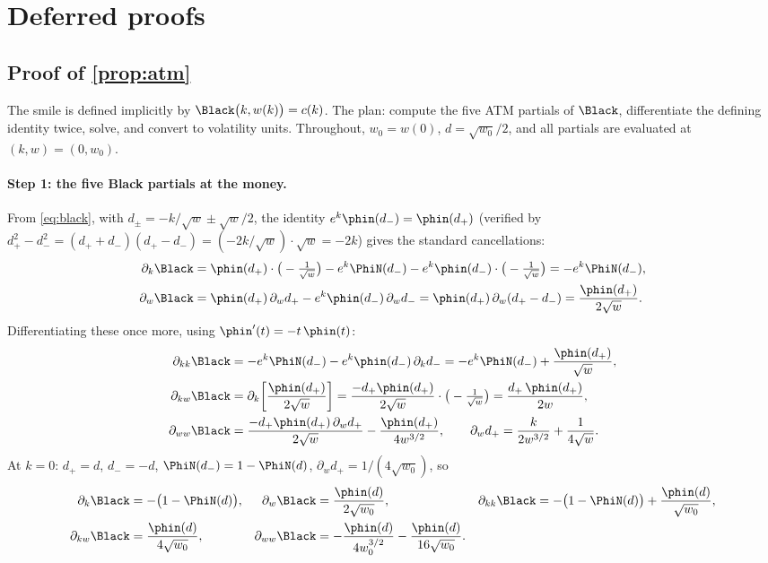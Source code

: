 \section{Deferred proofs}
\label{app:proofs}

\subsection{Proof of \texorpdfstring{\cref{prop:atm}}{the ATM proposition}}
\label{app:atmproof}

The smile is defined implicitly by $\Black\big(k,w(k)\big)=c(k)$.  The
plan: compute the five ATM partials of $\Black$, differentiate the
defining identity twice, solve, and convert to volatility units.
Throughout, $w_0=w(0)$, $d=\sqrt{w_0}/2$, and all partials are evaluated
at $(k,w)=(0,w_0)$.

\paragraph{Step 1: the five Black partials at the money.}
From \eqref{eq:black}, with $d_\pm=-k/\sqrt{w}\pm\sqrt{w}/2$, the
identity $e^{k}\phin(d_-)=\phin(d_+)$ (verified by
$d_+^2-d_-^2=(d_++d_-)(d_+-d_-)=(-2k/\sqrt{w})\cdot\sqrt{w}=-2k$) gives
the standard cancellations:
\begin{align*}
\partial_k\Black
&=\phin(d_+)\cdot\big(-\tfrac{1}{\sqrt w}\big)
 -e^{k}\PhiN(d_-)-e^{k}\phin(d_-)\cdot\big(-\tfrac{1}{\sqrt w}\big)
 =-e^{k}\PhiN(d_-),\\
\partial_w\Black
&=\phin(d_+)\,\partial_w d_+-e^{k}\phin(d_-)\,\partial_w d_-
 =\phin(d_+)\,\partial_w(d_+-d_-)
 =\frac{\phin(d_+)}{2\sqrt{w}} .
\end{align*}
Differentiating these once more, using $\phin'(t)=-t\,\phin(t)$:
\begin{align*}
\partial_{kk}\Black
&=-e^{k}\PhiN(d_-)-e^{k}\phin(d_-)\,\partial_k d_-
 =-e^{k}\PhiN(d_-)+\frac{\phin(d_+)}{\sqrt{w}},\\
\partial_{kw}\Black
&=\partial_k\!\left[\frac{\phin(d_+)}{2\sqrt w}\right]
 =\frac{-d_+\phin(d_+)}{2\sqrt w}\cdot\big(-\tfrac{1}{\sqrt w}\big)
 =\frac{d_+\,\phin(d_+)}{2w},\\
\partial_{ww}\Black
&=\frac{-d_+\phin(d_+)\,\partial_w d_+}{2\sqrt w}
 -\frac{\phin(d_+)}{4w^{3/2}},
\qquad
\partial_w d_+=\frac{k}{2w^{3/2}}+\frac{1}{4\sqrt w}.
\end{align*}
At $k=0$: $d_+=d$, $d_-=-d$, $\PhiN(d_-)=1-\PhiN(d)$,
$\partial_wd_+=1/(4\sqrt{w_0})$, so
\begin{equation}
\begin{aligned}
\partial_k\Black&=-\big(1-\PhiN(d)\big), &
\partial_w\Black&=\frac{\phin(d)}{2\sqrt{w_0}}, &
\partial_{kk}\Black&=-\big(1-\PhiN(d)\big)+\frac{\phin(d)}{\sqrt{w_0}},\\
\partial_{kw}\Black&=\frac{\phin(d)}{4\sqrt{w_0}}, &
\partial_{ww}\Black&=-\frac{\phin(d)}{4w_0^{3/2}}
-\frac{\phin(d)}{16\sqrt{w_0}} . &&
\end{aligned}
\label{eq:blackpartials}
\end{equation}

